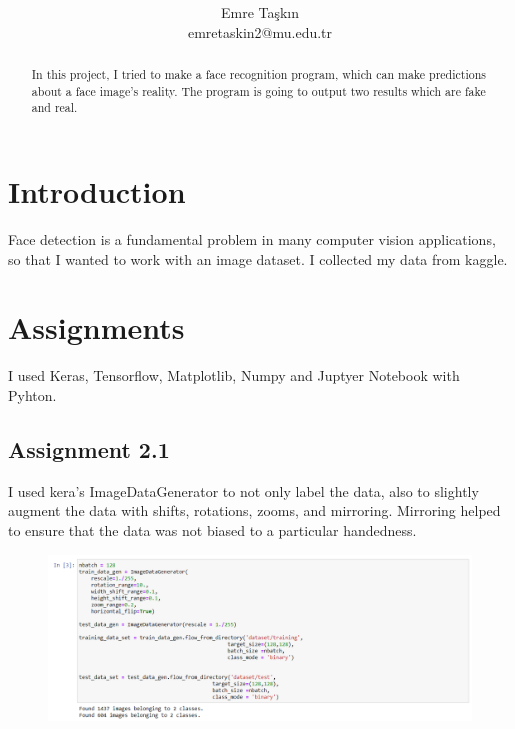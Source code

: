 \documentclass[onecolumn]{article}
\title{\spacecaps{FACE DETECTION PROJECT}\\ \normalsize \spacesc{ DATA MINING} }
\author{Emre Taşkın\\emretaskin2@mu.edu.tr}
\begin{document}
\maketitle

\begin{abstract}
In this project, I tried to make a face recognition program, which can make predictions about a face image's reality. The program is going to output two results which are fake and real.
\end{abstract}


\section{Introduction}
Face detection is a fundamental problem in many computer vision applications, so that I wanted to work with an image dataset. I collected my data from kaggle.

\section{Assignments}
I used Keras, Tensorflow, Matplotlib, Numpy and Juptyer Notebook with Pyhton.
\subsection{Assignment 2.1}

I used kera's ImageDataGenerator to not only label the data, also to slightly augment the data with shifts, rotations, zooms, and mirroring. Mirroring helped to ensure that the data was not biased to a particular handedness.

\begin{figure}[H]
\centering
    \includegraphics[width=1\linewidth]{assg1.png}
\caption{}
\end{figure}
\end{document}
